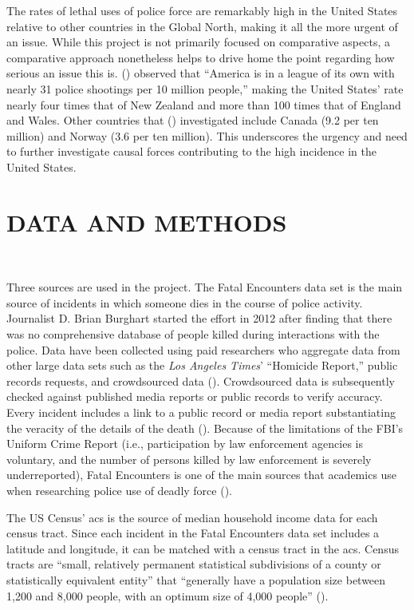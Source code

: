 \documentclass[12pt]{article}
\begin{document}
The rates of lethal uses of police force are remarkably high in the United States relative to other countries in the Global North, making it all the more urgent of an issue. While this project is not primarily focused on comparative aspects, a comparative approach nonetheless helps to drive home the point regarding how serious an issue this is. \citeauthor{espinerLicenceKillStartling2022} (\citeyear{espinerLicenceKillStartling2022}) observed that “America is in a league of its own with nearly 31 police shootings per 10 million people,” making the United States' rate nearly four times that of New Zealand and more than 100 times that of England and Wales. Other countries that \citeauthor{espinerLicenceKillStartling2022} (\citeyear{espinerLicenceKillStartling2022}) investigated include Canada (9.2 per ten million) and Norway (3.6 per ten million). This underscores the urgency and need to further investigate causal forces contributing to the high incidence in the United States.

\section{DATA AND METHODS}\

Three sources are used in the project. The Fatal Encounters data set is the main source of incidents in which someone dies in the course of police activity. Journalist D. Brian Burghart started the effort in 2012 after finding that there was no comprehensive database of people killed during interactions with the police. Data have been collected using paid researchers who aggregate data from other large data sets such as the \textit{Los Angeles Times}’ “Homicide Report,” public records requests, and crowdsourced data (\cite{burghartMeFatalEncounters}). Crowdsourced data is subsequently checked against published media reports or public records to verify accuracy. Every incident includes a link to a public record or media report substantiating the veracity of the details of the death (\cite{burghartMeFatalEncounters}). Because of the limitations of the FBI’s Uniform Crime Report (i.e., participation by law enforcement agencies is voluntary, and the number of persons killed by law enforcement is severely underreported), Fatal Encounters is one of the main sources that academics use when researching police use of deadly force (\cite{feldmanKilledPoliceValidity2017, feldmanQuantifyingUnderreportingLawenforcementrelated2017, feldmanPoliceRelatedDeathsNeighborhood2019}).

The US Census’ \acrfull{acs} is the source of median household income data for each census tract. Since each incident in the Fatal Encounters data set includes a latitude and longitude, it can be matched with a census tract in the \acrshort{acs}. Census tracts are “small, relatively permanent statistical subdivisions of a county or statistically equivalent entity” that “generally have a population size between 1,200 and 8,000 people, with an optimum size of 4,000 people” (\cite{bureauGlossary}).
\end{document}
